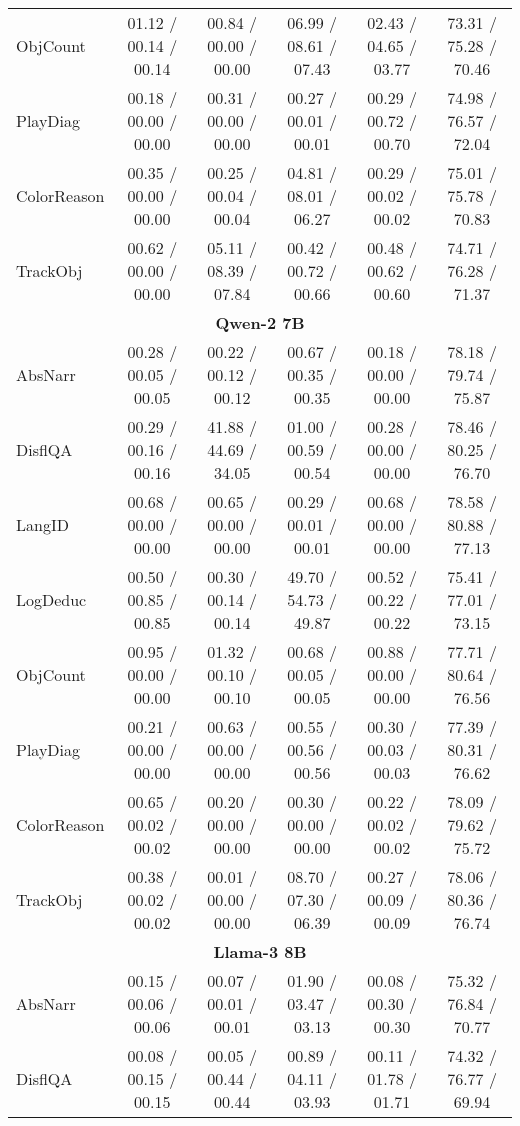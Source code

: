 \begin{table*}[tb]
{\begin{tabular}{lccccc}
    ObjCount
& 01.12 / 00.14 / 00.14& 00.84 / 00.00 / 00.00& 06.99 / 08.61 / 07.43& 02.43 / 04.65 / 03.77& 73.31 / 75.28 / 70.46
\\
    PlayDiag
& 00.18 / 00.00 / 00.00& 00.31 / 00.00 / 00.00& 00.27 / 00.01 / 00.01& 00.29 / 00.72 / 00.70& 74.98 / 76.57 / 72.04
\\
    ColorReason
& 00.35 / 00.00 / 00.00& 00.25 / 00.04 / 00.04& 04.81 / 08.01 / 06.27& 00.29 / 00.02 / 00.02& 75.01 / 75.78 / 70.83
\\
    TrackObj& 00.62 / 00.00 / 00.00& 05.11 / 08.39 / 07.84& 00.42 / 00.72 / 00.66& 00.48 / 00.62 / 00.60& 74.71 / 76.28 / 71.37\\
    \bottomrule
    \multicolumn{6}{c}{\textbf{Qwen-2 7B}} \\
    AbsNarr
& 00.28 / 00.05 / 00.05
& 00.22 / 00.12 / 00.12
& 00.67 / 00.35 / 00.35
& 00.18 / 00.00 / 00.00& 78.18 / 79.74 / 75.87
\\
    DisflQA
& 00.29 / 00.16 / 00.16
& 41.88 / 44.69 / 34.05
& 01.00 / 00.59 / 00.54
& 00.28 / 00.00 / 00.00& 78.46 / 80.25 / 76.70
\\
    LangID
& 00.68 / 00.00 / 00.00
& 00.65 / 00.00 / 00.00
& 00.29 / 00.01 / 00.01
& 00.68 / 00.00 / 00.00& 78.58 / 80.88 / 77.13
\\
    LogDeduc
& 00.50 / 00.85 / 00.85
& 00.30 / 00.14 / 00.14
& 49.70 / 54.73 / 49.87
& 00.52 / 00.22 / 00.22& 75.41 / 77.01 / 73.15
\\
    ObjCount
& 00.95 / 00.00 / 00.00
& 01.32 / 00.10 / 00.10
& 00.68 / 00.05 / 00.05
& 00.88 / 00.00 / 00.00& 77.71 / 80.64 / 76.56
\\
    PlayDiag
& 00.21 / 00.00 / 00.00
& 00.63 / 00.00 / 00.00
& 00.55 / 00.56 / 00.56
& 00.30 / 00.03 / 00.03& 77.39 / 80.31 / 76.62
\\
    ColorReason
& 00.65 / 00.02 / 00.02
& 00.20 / 00.00 / 00.00
& 00.30 / 00.00 / 00.00
& 00.22 / 00.02 / 00.02& 78.09 / 79.62 / 75.72
\\
    TrackObj& 00.38 / 00.02 / 00.02& 00.01 / 00.00 / 00.00& 08.70 / 07.30 / 06.39& 00.27 / 00.09 / 00.09& 78.06 / 80.36 / 76.74\\
    \bottomrule
    \multicolumn{6}{c}{\textbf{Llama-3 8B}} \\
    AbsNarr
& 00.15 / 00.06 / 00.06& 00.07 / 00.01 / 00.01& 01.90 / 03.47 / 03.13& 00.08 / 00.30 / 00.30& 75.32 / 76.84 / 70.77
\\
    DisflQA
& 00.08 / 00.15 / 00.15& 00.05 / 00.44 / 00.44& 00.89 / 04.11 / 03.93& 00.11 / 01.78 / 01.71& 74.32 / 76.77 / 69.94
\\

\end{tabular}}
\end{table*}
